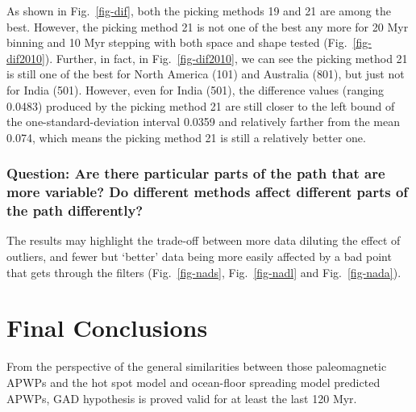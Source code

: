 As shown in Fig.~\ref{fig-dif}, both the picking methods 19 and 21 are among the
best. However, the picking method 21 is not one of the best any more for 20 Myr
binning and 10 Myr stepping with both space and shape tested
(Fig.~\ref{fig-dif2010}). Further, in fact, in Fig.~\ref{fig-dif2010}, we can
see the picking method 21 is still one of the best for North America (101) and
Australia (801), but just not for India (501). However, even for India (501),
the difference values (ranging 0.0483) produced by the picking
method 21 are still closer to the left bound of the one-standard-deviation
interval 0.0359 and relatively farther from the mean 0.074,
which means the picking method 21 is still a relatively better one.


\subsubsection{Question: Are there particular parts of the path that are more
variable? Do different methods affect different parts of the path differently?}

The results may highlight the trade-off between more data diluting the effect of
outliers, and fewer but `better' data being more easily affected by a bad point
that gets through the filters (Fig.~\ref{fig-nads}, Fig.~\ref{fig-nadl} and
Fig.~\ref{fig-nada}).



\section{Final Conclusions}

From the perspective of the general similarities between those paleomagnetic
APWPs and the hot spot model and ocean-floor spreading model predicted APWPs,
GAD hypothesis is proved valid for at least the last 120 Myr.

